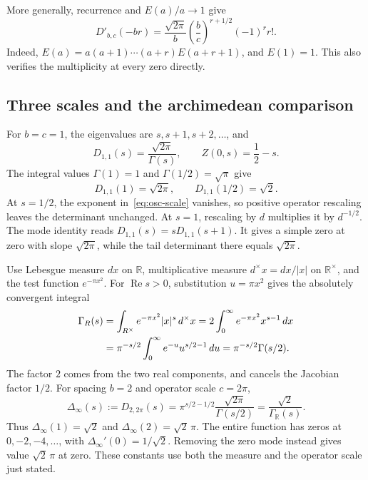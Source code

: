 More generally, recurrence and \(E(a)/a\to1\) give
\[
 D'_{b,c}(-br)=\frac{\sqrt{2\pi}}{b}
       \left(\frac bc\right)^{r+1/2}(-1)^r r!.
\]
Indeed, \(E(a)=a(a+1)\cdots(a+r)E(a+r+1)\), and \(E(1)=1\).
This also verifies the multiplicity at every zero directly.

\subsection{Three scales and the archimedean comparison}

\begin{example}
For \(b=c=1\), the eigenvalues are \(s,s+1,s+2,\ldots\), and
\[
 D_{1,1}(s)=\frac{\sqrt{2\pi}}{\Gamma(s)},\qquad
 Z(0,s)=\frac12-s.
\]
The integral values \(\Gamma(1)=1\) and \(\Gamma(1/2)=\sqrt\pi\) give
\[
 D_{1,1}(1)=\sqrt{2\pi},\qquad D_{1,1}(1/2)=\sqrt2.
\]
At \(s=1/2\), the exponent in~\eqref{eq:osc-scale} vanishes, so positive
operator rescaling leaves the determinant unchanged. At \(s=1\),
rescaling by \(d\) multiplies it by \(d^{-1/2}\).
The mode identity reads \(D_{1,1}(s)=sD_{1,1}(s+1)\).
It gives a simple zero at zero with slope \(\sqrt{2\pi}\), while the
tail determinant there equals \(\sqrt{2\pi}\).
\end{example}

\begin{example}
Use Lebesgue measure \(dx\) on \(\mathbb R\), multiplicative measure
\(d^\times x=dx/|x|\) on \(\mathbb R^\times\), and the test function
\(e^{-\pi x^2}\). For \(\operatorname{Re}s>0\), substitution
\(u=\pi x^2\) gives the absolutely convergent integral
\begin{align}
 \Gamma_{\mathbb R}(s)
 &=\int_{\mathbb R^\times}e^{-\pi x^2}|x|^s\,d^\times x
   =2\int_0^\infty e^{-\pi x^2}x^{s-1}\,dx\notag\\
 &=\pi^{-s/2}\int_0^\infty e^{-u}u^{s/2-1}\,du
   =\pi^{-s/2}\Gamma(s/2).                         \label{eq:osc-real-factor}
\end{align}
The factor \(2\) comes from the two real components, and cancels the
Jacobian factor \(1/2\).
For spacing \(b=2\) and operator scale \(c=2\pi\),
\begin{equation}
 \Delta_\infty(s):=D_{2,2\pi}(s)
 =\pi^{s/2-1/2}\frac{\sqrt{2\pi}}{\Gamma(s/2)}
 =\frac{\sqrt2}{\Gamma_{\mathbb R}(s)}.             \label{eq:osc-archimedean}
\end{equation}
Thus \(\Delta_\infty(1)=\sqrt2\) and
\(\Delta_\infty(2)=\sqrt2\,\pi\).
The entire function has zeros at \(0,-2,-4,\ldots\), with
\(\Delta_\infty'(0)=1/\sqrt2\).
Removing the zero mode instead gives value \(\sqrt2\,\pi\) at zero.
These constants use both the measure and the operator scale just stated.
\end{example}

